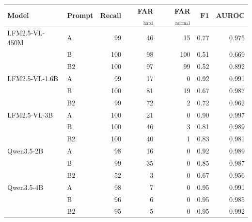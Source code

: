 \begin{tabular}{llrrrrr}
\toprule
Model & Prompt & Recall & FAR$_\text{hard}$ & FAR$_\text{normal}$ & F1 & AUROC \\
\midrule
LFM2.5-VL-450M & A & 99 & 46 & 15 & 0.77 & 0.975 \\
 & B & 100 & 98 & 100 & 0.51 & 0.669 \\
 & B2 & 100 & 97 & 99 & 0.52 & 0.892 \\
\midrule
LFM2.5-VL-1.6B & A & 99 & 17 & 0 & 0.92 & 0.991 \\
 & B & 100 & 81 & 19 & 0.67 & 0.987 \\
 & B2 & 99 & 72 & 2 & 0.72 & 0.962 \\
\midrule
LFM2.5-VL-3B & A & 100 & 21 & 0 & 0.90 & 0.997 \\
 & B & 100 & 46 & 3 & 0.81 & 0.989 \\
 & B2 & 100 & 40 & 1 & 0.83 & 0.981 \\
\midrule
Qwen3.5-2B & A & 98 & 16 & 0 & 0.92 & 0.989 \\
 & B & 99 & 35 & 0 & 0.85 & 0.987 \\
 & B2 & 52 & 3 & 0 & 0.67 & 0.956 \\
\midrule
Qwen3.5-4B & A & 98 & 7 & 0 & 0.95 & 0.991 \\
 & B & 96 & 6 & 0 & 0.95 & 0.985 \\
 & B2 & 95 & 5 & 0 & 0.95 & 0.992 \\
\bottomrule
\end{tabular}
